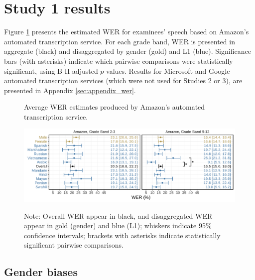 \documentclass [PhD] {uclathes}
\begin{document}
\section{Study 1 results}

Figure \ref{wer_aws} presents the estimated WER for examinees’ speech based on Amazon’s automated transcription service. For each grade band, WER is presented in aggregate (black) and disaggregated by gender (gold) and L1 (blue). Significance bars (with asterisks) indicate which pairwise comparisons were statistically significant, using B-H adjusted $p$-values. Results for Microsoft and Google automated transcription services (which were not used for Studies 2 or 3), are presented in Appendix \ref{sec:appendix_wer}. 

\begin{figure}[h]
    \centering
    \caption{Average WER estimates produced by Amazon’s automated transcription service.}
    \includegraphics[width=6.5in]{figures/20230513_adj_werPlot_sigBars_aws.pdf}
    \label{wer_aws}
\caption*{\small Note: Overall WER appear in black, and disaggregated WER appear in gold (gender) and blue (L1); whiskers indicate 95\% confidence intervals; brackets with asterisks indicate statistically significant pairwise comparisons.}
\end{figure}

\subsection{Gender biases}
\end{document}
